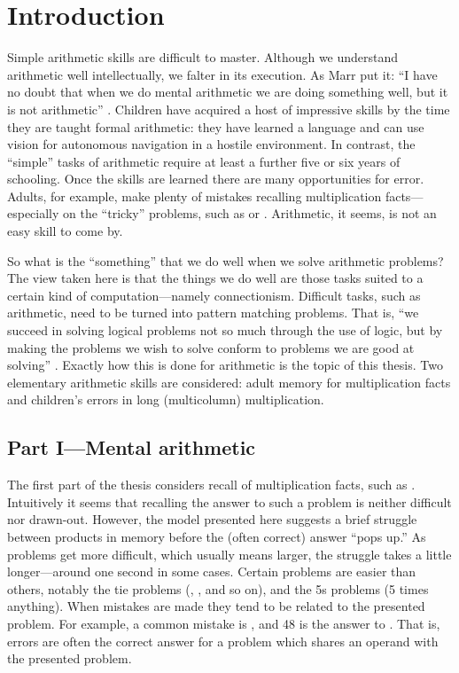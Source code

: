 \chapter{Introduction}\label{c:intro}

Simple arithmetic skills are difficult to master. Although we understand
arithmetic well intellectually, we falter in its execution. As Marr put it:
``I have no doubt that when we do mental arithmetic we are doing something
well, but it is not arithmetic'' \citeyear[p.~348]{marrviso}. Children have
acquired a
host of impressive skills by the time they are taught formal arithmetic:
they have learned a language and can use vision for autonomous navigation
in a hostile environment. In contrast, the ``simple'' tasks of arithmetic
require at least a further five or six years of schooling. Once the skills
are learned there are many opportunities for error. Adults, for example,
make plenty of mistakes recalling multiplication facts---especially on the
``tricky'' problems, such as  or . Arithmetic, it seems, is not an
easy skill to come by.

So what is the ``something'' that we do well when we solve arithmetic
problems? The view taken here is that the things we do well are those tasks
suited to a certain kind of computation---namely connectionism. Difficult
tasks, such as arithmetic, need to be turned into pattern matching
problems.  That is, ``we succeed in solving logical problems not so much
through the use of logic, but by making the problems we wish to solve
conform to problems we are good at solving'' \cite[p.~44]{pdp:14}. Exactly
how this is done for arithmetic is the topic of this thesis. Two elementary
arithmetic skills are considered: adult memory for multiplication facts and
children's errors in long (multicolumn) multiplication.


\section{Part I---Mental arithmetic}

The first part of the thesis considers recall of multiplication
facts, such as .  Intuitively it seems that recalling the
answer to such a problem is neither difficult nor drawn-out. However, the
model presented here suggests a brief struggle between products in memory
before the (often correct) answer ``pops up.'' As problems get more
difficult, which usually means larger, the struggle takes a little
longer---around one second in some cases. Certain problems are easier than
others, notably the tie problems (, , and so on), and the 5s
problems (5 times anything).  When mistakes are made they tend to be
related to the presented problem.  For example, a common mistake is
, and 48 is the answer to .  That is, errors are
often the correct answer for a problem which shares an operand with the
presented problem.

